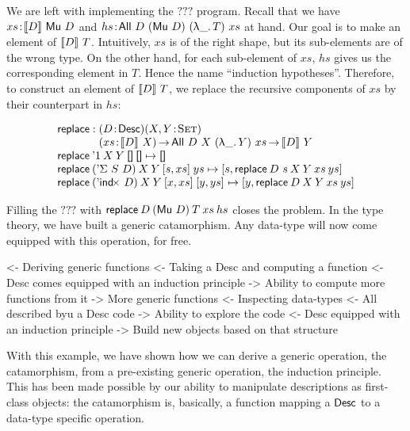 We are left with implementing the \(???\) program. Recall that we have
\(\Bhab{xs}{\descop{D}{\Mu{D}}}\) and
\(\Bhab{hs}{\All{D}{(\Mu{D})}{(\LAM{\_} T)}{xs}}\) at hand. Our goal
is to make an element of \(\descop{D}{T}\). Intuitively, $xs$ is of
the right shape, but its sub-elements are of the wrong type. On the
other hand, for each sub-element of $xs$, $hs$ gives us the
corresponding element in $T$. Hence the name ``induction
hypotheses''. Therefore, to construct an element of \(\descop{D}{T}\),
we replace the recursive components of \(xs\) by their counterpart in
\(hs\):


\[\stk{
\F{replace} : \stk{\PITEL{D}{\Desc}
                   \PITEL{X,Y}{\Set}\\
                   \PI{xs}{\descop{D}{X}} 
                   \All{D}{X}{(\LAM{\_}Y)}{xs} \To
                   \descop{D}{Y}} \\
\F{replace}\: \DUnit\:          X\: Y\: \Void\:          \Void          \mapsto \Void \\
\F{replace}\: (\DSigma{S}{D})\: X\: Y\: \pair{s}{xs}{}\: ys             \mapsto
    \pair{s}{\F{replace}\: {D~s}\: X\: Y\: xs\: ys}{}                                 \\
\F{replace}\: (\DIndx{D})\:     X\: Y\: \pair{x}{xs}{}\: \pair{y}{ys}{} \mapsto
    \pair{y}{\F{replace}\: D\: X\: Y\: xs\: ys}{}
}\]

Filling the \(???\) with \(\F{replace}\: D\: (\Mu{D})\: T\: xs\: hs\) closes the
problem. In the type theory, we have built a generic catamorphism. Any
data-type will now come equipped with this operation, for free.

\begin{wstructure}
<- Deriving generic functions
    <- Taking a Desc and computing a function
        <- Desc comes equipped with an induction principle
        -> Ability to compute more functions from it
            -> More generic functions
    <- Inspecting data-types
        <- All described byu a Desc code
        -> Ability to explore the code
            <- Desc equipped with an induction principle
            -> Build new objects based on that structure
\end{wstructure}

With this example, we have shown how we can derive a generic
operation, the catamorphism, from a pre-existing generic operation,
the induction principle. This has been made possible by our ability to
manipulate descriptions as first-class objects: the catamorphism is,
basically, a function mapping a $\Desc$ to a data-type specific
operation.

